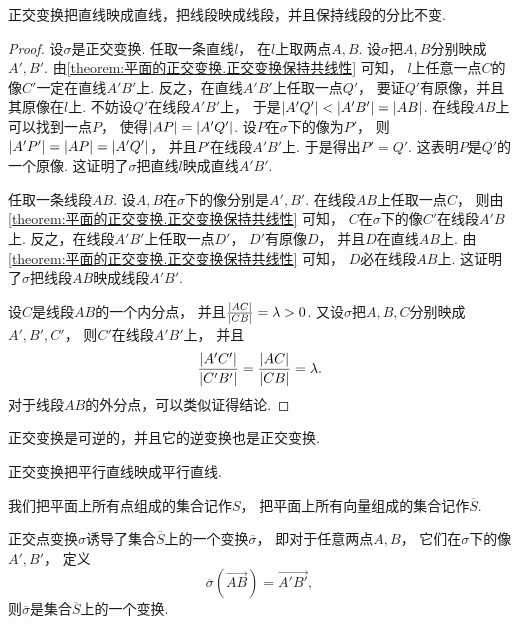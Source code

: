 \begin{property}
正交变换把直线映成直线，把线段映成线段，并且保持线段的分比不变.
\begin{proof}
设\(\sigma\)是正交变换.
任取一条直线\(l\)，
在\(l\)上取两点\(A,B\).
设\(\sigma\)把\(A,B\)分别映成\(A',B'\).
由\cref{theorem:平面的正交变换.正交变换保持共线性} 可知，
\(l\)上任意一点\(C\)的像\(C'\)一定在直线\(A'B'\)上.
反之，在直线\(A'B'\)上任取一点\(Q'\)，
要证\(Q'\)有原像，并且其原像在\(l\)上.
不妨设\(Q'\)在线段\(A'B'\)上，
于是\(
	\abs{A'Q'}
	< \abs{A'B'}
	= \abs{AB}
\).
在线段\(AB\)上可以找到一点\(P\)，
使得\(
	\abs{AP}
	= \abs{A'Q'}
\).
设\(P\)在\(\sigma\)下的像为\(P'\)，
则\(
	\abs{A'P'}
	= \abs{AP}
	= \abs{A'Q'}
\)，
并且\(P'\)在线段\(A'B'\)上.
于是得出\(P'=Q'\).
这表明\(P\)是\(Q'\)的一个原像.
这证明了\(\sigma\)把直线\(l\)映成直线\(A'B'\).

任取一条线段\(AB\).
设\(A,B\)在\(\sigma\)下的像分别是\(A',B'\).
在线段\(AB\)上任取一点\(C\)，
则由\cref{theorem:平面的正交变换.正交变换保持共线性} 可知，
\(C\)在\(\sigma\)下的像\(C'\)在线段\(A'B\)上.
反之，在线段\(A'B'\)上任取一点\(D'\)，
\(D'\)有原像\(D\)，
并且\(D\)在直线\(AB\)上.
由\cref{theorem:平面的正交变换.正交变换保持共线性} 可知，
\(D\)必在线段\(AB\)上.
这证明了\(\sigma\)把线段\(AB\)映成线段\(A'B'\).

设\(C\)是线段\(AB\)的一个内分点，
并且\(\frac{\abs{AC}}{\abs{CB}} = \lambda > 0\).
又设\(\sigma\)把\(A,B,C\)分别映成\(A',B',C'\)，
则\(C'\)在线段\(A'B'\)上，
并且\begin{equation*}
	\frac{\abs{A'C'}}{\abs{C'B'}}
	= \frac{\abs{AC}}{\abs{CB}}
	= \lambda.
\end{equation*}
对于线段\(AB\)的外分点，可以类似证得结论.
\end{proof}
\end{property}

\begin{property}
正交变换是可逆的，并且它的逆变换也是正交变换.
\end{property}

\begin{property}
正交变换把平行直线映成平行直线.
\end{property}

我们把平面上所有点组成的集合记作\(S\)，
把平面上所有向量组成的集合记作\(\overline{S}\).
\begin{property}
正交点变换\(\sigma\)诱导了集合\(\overline{S}\)上的一个变换\(\overline{\sigma}\)，
即对于任意两点\(A,B\)，
它们在\(\sigma\)下的像\(A',B'\)，
定义\begin{equation*}
	\overline{\sigma}(\vec{AB}) = \vec{A'B'},
\end{equation*}
则\(\overline{\sigma}\)是集合\(\overline{S}\)上的一个变换.
\end{property}

